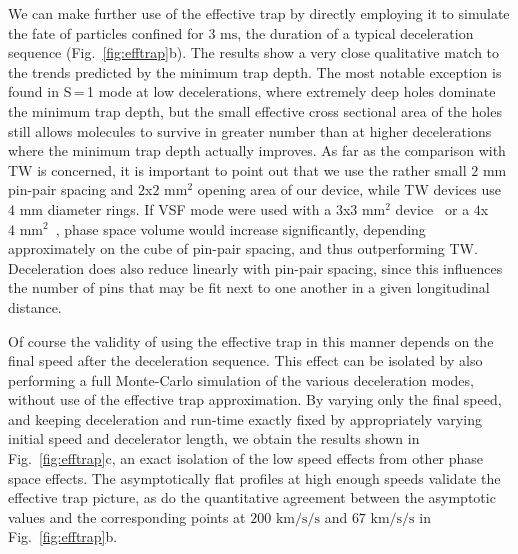 We can make further use of the effective trap by directly employing it to simulate the fate of particles confined for $3\text{ ms}$, the duration of a typical deceleration sequence (Fig.~\ref{fig:efftrap}b). 
The results show a very close qualitative match to the trends predicted by the minimum trap depth. 
The most notable exception is found in S\,=\,1 mode at low decelerations, where extremely deep holes dominate the minimum trap depth, but the small effective cross sectional area of the holes still allows molecules to survive in greater number than at higher decelerations where the minimum trap depth actually improves.
As far as the comparison with TW is concerned, it is important to point out that we use the rather small $2\text{ mm}$ pin-pair spacing and $2$x$2\text{ mm}^2$ opening area of our device, while TW devices use $4\text{ mm}$ diameter rings.
If VSF mode were used with a $3$x$3\text{ mm}^2$ device~\cite{Scharfenberg2009} or a $4$x$4\text{ mm}^2$~\cite{VanDeMeerakker2005}, phase space volume would increase significantly, depending approximately on the cube of pin-pair spacing, and thus outperforming TW. 
Deceleration does also reduce linearly with pin-pair spacing, since this influences the number of pins that may be fit next to one another in a given longitudinal distance.

Of course the validity of using the effective trap in this manner depends on the final speed after the deceleration sequence.
This effect can be isolated by also performing a full Monte-Carlo simulation of the various deceleration modes, without use of the effective trap approximation.
By varying only the final speed, and keeping deceleration and run-time exactly fixed by appropriately varying initial speed and decelerator length, we obtain the results shown in Fig.~\ref{fig:efftrap}c, an exact isolation of the low speed effects from other phase space effects.
The asymptotically flat profiles at high enough speeds validate the effective trap picture, as do the quantitative agreement between the asymptotic values and the corresponding points at $200\text{ km/s/s}$ and $67\text{ km/s/s}$ in Fig.~\ref{fig:efftrap}b. 

